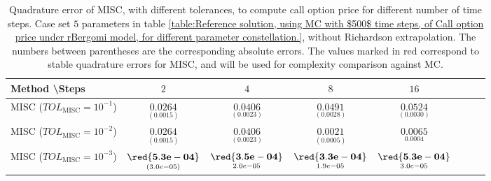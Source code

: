 \begin{table}[h!]
	\centering
	\begin{tabular}{l*{6}{c}r}
		Method \textbackslash  Steps            & $2$ & $4$ & $8$ & $16$  \\
		\hline
		MISC ($TOL_{\text{MISC}}=10^{-1}$)  & $\underset{(  0.0015
			)}{\mathbf{     0.0264}}$& $\underset{(    0.0023
			)}{\mathbf{         0.0406}}$& $\underset{(    0.0028)}{\mathbf{      0.0491
		}}$  & $\underset{(      
			0.0030)}{\mathbf{     0.0524
		}}$   \\
		MISC ($TOL_{\text{MISC}}=10^{-2}$)  & $\underset{(  0.0015
			)}{\mathbf{     0.0264}}$ &$\underset{(    0.0023
			)}{\mathbf{         0.0406}}$ & $\underset{(0.0005)}{\mathbf{    0.0021
		}}$ &  $\underset{0.0004}{\mathbf{    0.0065}}$  \\
		MISC ($TOL_{\text{MISC}}=10^{-3}$)  & $\underset{(      3.0e-05)}{\mathbf{    \red{5.3e-04}}}$ & $\underset{2.0e-05}{\mathbf{\red{3.5e-04}}}$& $\underset{1.9e-05}{\mathbf{\red{3.3e-04}}}$ &  $\underset{3.0e-05}{\mathbf{\red{5.3e-04}}}$  \\
%		
%		
		\hline
		
	\end{tabular}
	\caption{Quadrature error of MISC, with  different tolerances,  to compute call option price  for different number of time steps. Case  set $5$ parameters in table \ref{table:Reference solution, using MC with $500$ time steps, of Call option price under rBergomi model, for different parameter constellation.}, without Richardson extrapolation. The numbers between parentheses are the corresponding absolute errors. The values marked in red correspond to stable quadrature errors for MISC, and will be used for complexity comparison against MC.}
	\label{Quadrature error of MISC to compute Call option price of the different tolerances for different number of time steps. Case  set $5$ parameters, without Richardson extrapolation. The numbers between parentheses are the corresponding absolute errors.}
\end{table}